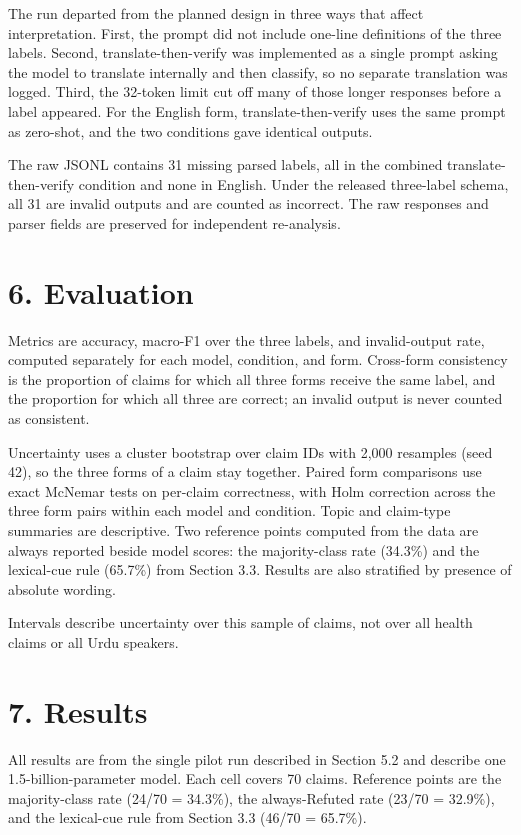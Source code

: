 \documentclass[10pt,a4paper]{article}
\begin{document}
The run departed from the planned design in three ways that affect interpretation. First, the prompt did not include one-line definitions of the three labels. Second, translate-then-verify was implemented as a single prompt asking the model to translate internally and then classify, so no separate translation was logged. Third, the 32-token limit cut off many of those longer responses before a label appeared. For the English form, translate-then-verify uses the same prompt as zero-shot, and the two conditions gave identical outputs.

The raw JSONL contains 31 missing parsed labels, all in the combined translate-then-verify condition and none in English. Under the released three-label schema, all 31 are invalid outputs and are counted as incorrect. The raw responses and parser fields are preserved for independent re-analysis.

\section{6. Evaluation}
Metrics are accuracy, macro-F1 over the three labels, and invalid-output rate, computed separately for each model, condition, and form. Cross-form consistency is the proportion of claims for which all three forms receive the same label, and the proportion for which all three are correct; an invalid output is never counted as consistent.

Uncertainty uses a cluster bootstrap over claim IDs with 2,000 resamples (seed 42), so the three forms of a claim stay together. Paired form comparisons use exact McNemar tests on per-claim correctness, with Holm correction across the three form pairs within each model and condition. Topic and claim-type summaries are descriptive. Two reference points computed from the data are always reported beside model scores: the majority-class rate (34.3\%) and the lexical-cue rule (65.7\%) from Section 3.3. Results are also stratified by presence of absolute wording.

Intervals describe uncertainty over this sample of claims, not over all health claims or all Urdu speakers.

\section{7. Results}
All results are from the single pilot run described in Section 5.2 and describe one 1.5-billion-parameter model. Each cell covers 70 claims. Reference points are the majority-class rate (24/70 = 34.3\%), the always-Refuted rate (23/70 = 32.9\%), and the lexical-cue rule from Section 3.3 (46/70 = 65.7\%).
\end{document}
